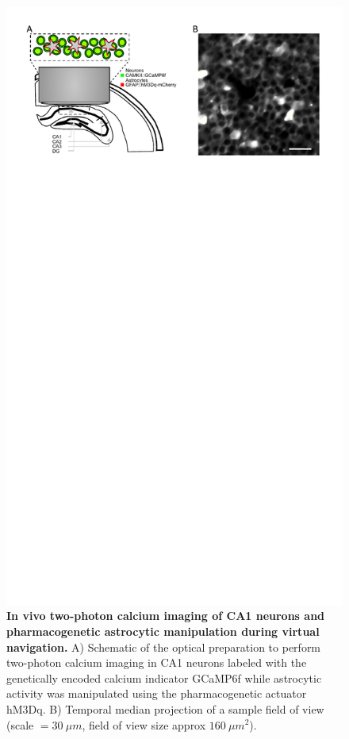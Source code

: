 \begin{figure}[h!]
    \centering
    \includegraphics[trim={0 530 0 0},clip,width=\textwidth]{Figures/Chapter4/FOV_example_setup.pdf}
    \caption[In vivo two-photon calcium imaging of CA1 neurons and pharmacogenetic astrocytic manipulation during virtual navigation.]{\textbf{In vivo two-photon calcium imaging of CA1 neurons and pharmacogenetic astrocytic manipulation during virtual navigation.} 
    A) Schematic of the optical preparation to perform two-photon calcium imaging in CA1 neurons labeled with the genetically encoded calcium indicator GCaMP6f while astrocytic activity was manipulated using the pharmacogenetic actuator hM3Dq. 
    B) Temporal median projection of a sample field of view (scale $= 30\ \mu m$, field of view size approx $160\ \mu m^2$).}
    \label{fig:chap4:FOV_example_setup}
\end{figure}
